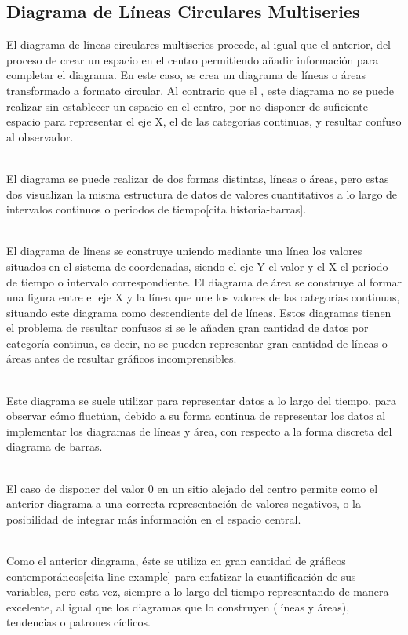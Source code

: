\documentclass{article}\usepackage[]{graphicx}\usepackage[]{color}
\begin{document}
\subsection{Diagrama de L\'ineas Circulares Multiseries}
El diagrama de l\'ineas circulares multiseries procede, al igual que el anterior, del proceso de crear un espacio en el centro permitiendo a\~nadir informaci\'on para completar el diagrama. En este caso, se crea un diagrama de l\'ineas o \'areas transformado a formato circular. Al contrario que el , este diagrama no se puede realizar sin establecer un espacio en el centro, por no disponer de suficiente espacio para representar el eje X, el de las categor\'ias continuas, y resultar confuso al observador.~\\~\par
El diagrama se puede realizar de dos formas distintas, l\'ineas o \'areas, pero estas dos visualizan la misma estructura de datos de valores cuantitativos a lo largo de intervalos continuos o periodos de tiempo[cita historia-barras].~\\~\par
El diagrama de l\'ineas se construye uniendo mediante una l\'inea los valores situados en el sistema de coordenadas, siendo el eje Y el valor y el X el periodo de tiempo o intervalo correspondiente. El diagrama de \'area se construye al formar una figura entre el eje X y la l\'inea que une los valores de las categor\'ias continuas, situando este diagrama como descendiente del de l\'ineas. Estos diagramas tienen el problema de resultar confusos si se le a\~naden gran cantidad de datos por categor\'ia continua, es decir, no se pueden representar gran cantidad de l\'ineas o \'areas antes de resultar gr\'aficos incomprensibles.~\\~\par
Este diagrama se suele utilizar para representar datos a lo largo del tiempo, para observar c\'omo fluct\'uan, debido a su forma continua de representar los datos al implementar los diagramas de l\'ineas y \'area, con respecto a la forma discreta del diagrama de barras.~\\~\par
El caso de disponer del valor 0 en un sitio alejado del centro permite como el anterior diagrama a una correcta representaci\'on de valores negativos, o la posibilidad de integrar m\'as informaci\'on en el espacio central.~\\~\par
Como el anterior diagrama, \'este se utiliza en gran cantidad de gr\'aficos contempor\'aneos[cita line-example] para enfatizar la cuantificaci\'on de sus variables, pero esta vez, siempre a lo largo del tiempo representando de manera excelente, al igual que los diagramas que lo construyen (l\'ineas y \'areas), tendencias o patrones c\'iclicos.
\end{document}
